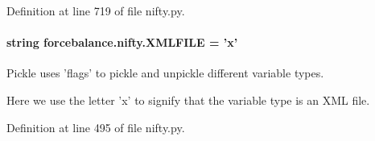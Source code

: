 Definition at line 719 of file nifty.\-py.

\hypertarget{namespaceforcebalance_1_1nifty_a338d5080f95188c37271c306f64093d8}{
\paragraph[{X\-M\-L\-F\-I\-L\-E}]{\setlength{\rightskip}{0pt plus 5cm}string forcebalance.\-nifty.\-X\-M\-L\-F\-I\-L\-E = 'x'}}\label{namespaceforcebalance_1_1nifty_a338d5080f95188c37271c306f64093d8}


Pickle uses 'flags' to pickle and unpickle different variable types. 

Here we use the letter 'x' to signify that the variable type is an X\-M\-L file. 

Definition at line 495 of file nifty.\-py.

